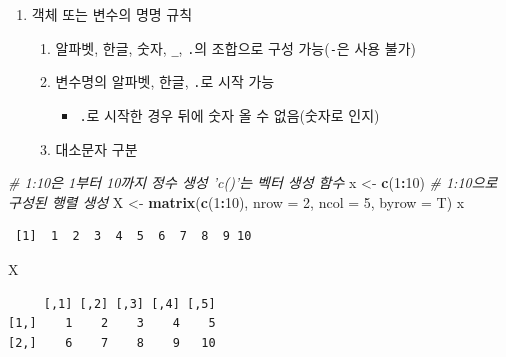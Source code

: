 \documentclass[11pt,a4paper]{book}
\newenvironment{Shaded}{\begin{snugshade}}{\end{snugshade}}
\newcommand{\KeywordTok}[1]{\textcolor[rgb]{0.13,0.29,0.53}{\textbf{#1}}}
\newcommand{\DataTypeTok}[1]{\textcolor[rgb]{0.13,0.29,0.53}{#1}}
\newcommand{\DecValTok}[1]{\textcolor[rgb]{0.00,0.00,0.81}{#1}}
\newcommand{\StringTok}[1]{\textcolor[rgb]{0.31,0.60,0.02}{#1}}
\newcommand{\CommentTok}[1]{\textcolor[rgb]{0.56,0.35,0.01}{\textit{#1}}}
\newcommand{\OperatorTok}[1]{\textcolor[rgb]{0.81,0.36,0.00}{\textbf{#1}}}
\newcommand{\NormalTok}[1]{#1}
\providecommand{\tightlist}{%
  \setlength{\itemsep}{0pt}\setlength{\parskip}{0pt}}
\theoremstyle{definition}
\theoremstyle{definition}
\theoremstyle{definition}
\theoremstyle{remark}
\begin{document}
\begin{enumerate}
\def\labelenumi{\arabic{enumi}.}
\setcounter{enumi}{1}
\tightlist
\item
  객체 또는 변수의 명명 규칙

  \begin{enumerate}
  \def\labelenumii{\arabic{enumii})}
  \tightlist
  \item
    알파벳, 한글, 숫자, \texttt{\_}, \texttt{.}의 조합으로 구성
    가능(\texttt{-}은 사용 불가)
  \item
    변수명의 알파벳, 한글, \texttt{.}로 시작 가능

    \begin{itemize}
    \tightlist
    \item
      \texttt{.}로 시작한 경우 뒤에 숫자 올 수 없음(숫자로 인지)
    \end{itemize}
  \item
    대소문자 구분
  \end{enumerate}
\end{enumerate}

\footnotesize

\begin{Shaded}
\begin{Highlighting}[]
\CommentTok{# 1:10은 1부터 10까지 정수 생성 'c()'는 벡터 생성 함수}
\NormalTok{x <-}\StringTok{ }\KeywordTok{c}\NormalTok{(}\DecValTok{1}\OperatorTok{:}\DecValTok{10}\NormalTok{)}
\CommentTok{# 1:10으로 구성된 행렬 생성}
\NormalTok{X <-}\StringTok{ }\KeywordTok{matrix}\NormalTok{(}\KeywordTok{c}\NormalTok{(}\DecValTok{1}\OperatorTok{:}\DecValTok{10}\NormalTok{), }\DataTypeTok{nrow =} \DecValTok{2}\NormalTok{, }\DataTypeTok{ncol =} \DecValTok{5}\NormalTok{, }\DataTypeTok{byrow =}\NormalTok{ T)}
\NormalTok{x}
\end{Highlighting}
\end{Shaded}

\begin{verbatim}
 [1]  1  2  3  4  5  6  7  8  9 10
\end{verbatim}

\begin{Shaded}
\begin{Highlighting}[]
\NormalTok{X}
\end{Highlighting}
\end{Shaded}

\begin{verbatim}
     [,1] [,2] [,3] [,4] [,5]
[1,]    1    2    3    4    5
[2,]    6    7    8    9   10
\end{verbatim}
\end{document}
